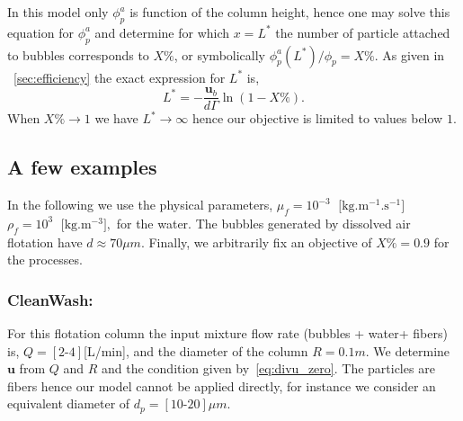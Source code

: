 In this model only $\phi_p^a$ is function of the column height, hence one may solve this equation for $\phi_p^a$ and determine for which $x = L^*$ the number of particle attached to bubbles corresponds to $X\%$, or symbolically $\phi_p^a(L^*)/\phi_p = X\%$.
As given in ~\ref{sec:efficiency} the exact expression for $L^*$ is, 
\begin{equation}
    \boxed{
        L^* = 
        - \frac{\textbf{u}_b}{d \Gamma}\ln(1 - X\%).
        }
    \label{eq:L_solution}
\end{equation}
When $X\% \to 1$ we have $L^* \to \infty$ hence our objective is limited to values below $1$. 

\subsection{A few examples}

In the following we use the physical parameters, 
$
    \mu_f = 10^{-3} \;\text{ [kg.m$^{-1}$.s$^{-1}$]}  $  
    $ 
    \rho_f = 10^{3} \;\text{ [kg.m$^{-3}$]},
$
for the water.  
The bubbles generated by dissolved air flotation have $d\approx 70\mu m$. 
Finally, we arbitrarily fix an objective of $X\% = 0.9$ for the processes. 

\subsubsection*{CleanWash:} 
For this flotation column the input mixture flow rate (bubbles + water+ fibers) is, $Q = [2\text{-}4]$[L/min], and the diameter of the column $R = 0.1 m$.
We determine $\textbf{u}$ from $Q$ and $R$ and the condition given by~\ref{eq:divu_zero}. 
The particles are fibers hence our model cannot be applied directly, for instance we consider an equivalent diameter of $d_p = [10\text{-}20]\mu m$. 

